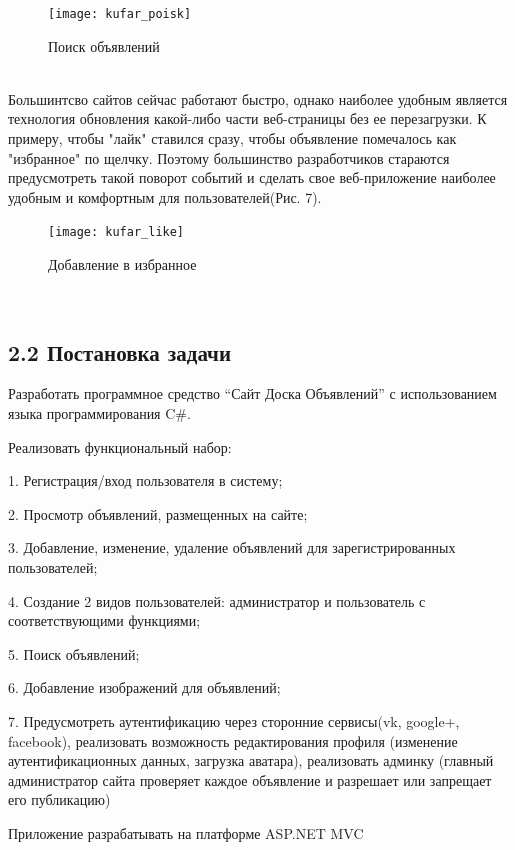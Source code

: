 \documentclass[14pt,a4paper]{extreport}
\begin{document}
	\begin{figure}[h]
	\begin{center}
	\texttt{[image: kufar\_poisk]}
	\caption{Поиск объявлений}
	\end{center}
	\end{figure}
	~\\
         Большинтсво сайтов сейчас работают быстро, однако наиболее удобным является технология обновления какой-либо части веб-страницы без ее перезагрузки. К примеру, чтобы "лайк" ставился сразу, чтобы объявление помечалось как "избранное" по щелчку. Поэтому большинство разработчиков стараются предусмотреть такой поворот событий и сделать свое веб-приложение наиболее удобным и комфортным для пользователей(Рис. 7).
	\begin{figure}[h]
	\begin{center}
	\texttt{[image: kufar\_like]}
	\caption{Добавление в избранное}
	\end{center}
	\end{figure}
	~\\
	\subsection*{\normalsize\hspace{4ex}2.2 Постановка задачи}
	\hspace{4ex}Разработать программное средство “Сайт Доска Объявлений” с использованием языка программирования C\#. 


	\hspace{4ex}Реализовать функциональный набор:

	\hspace{4ex}1. Регистрация/вход пользователя в систему;

	\hspace{4ex}2. Просмотр объявлений, размещенных на сайте;

	\hspace{4ex}3. Добавление, изменение, удаление объявлений для зарегистрированных пользователей;

	\hspace{4ex}4. Создание 2 видов пользователей: администратор и  пользователь с соответствующими функциями;

	\hspace{4ex}5. Поиск объявлений;

	\hspace{4ex}6. Добавление изображений для объявлений;\par
          	\hspace{4ex}7. Предусмотреть аутентификацию через сторонние сервисы(vk, google+, facebook),  реализовать возможность редактирования профиля (изменение аутентификационных данных, загрузка аватара), реализовать админку (главный администратор сайта проверяет каждое объявление и разрешает или запрещает его публикацию) \par 
	 Приложение разрабатывать на платформе ASP.NET MVC\par
\end{document}
